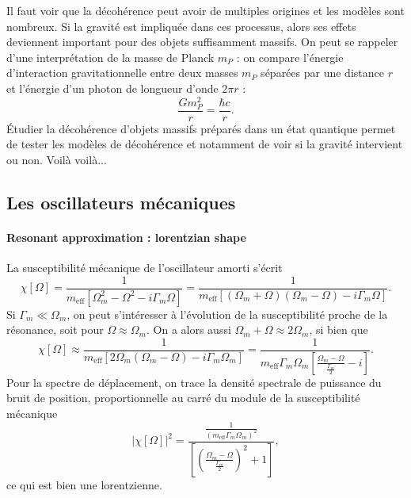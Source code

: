 \documentclass[12pt,a4paper]{article}
\begin{document}
Il faut voir que la décohérence peut avoir de multiples origines et les modèles sont nombreux.
Si la gravité est impliquée dans ces processus, alors ses effets deviennent important pour des objets suffisamment massifs.
On peut se rappeler d'une interprétation de la masse de Planck $m_P$ : on compare l'énergie d'interaction gravitationnelle entre deux masses $m_P$ séparées par une distance $r$ et l'énergie d'un photon de longueur d'onde $2\pi r$ : 
\begin{equation}
\frac{Gm_P^2}{r} = \frac{\hbar c}{r}.
\end{equation}
Étudier la décohérence d'objets massifs préparés dans un état quantique permet de tester les modèles de décohérence et notamment de voir si la gravité intervient ou non.
Voilà voilà...

\subsection{Les oscillateurs mécaniques}
\label{sec:mechanical_oscillators}

\paragraph{Resonant approximation : lorentzian shape\\}
La susceptibilité mécanique de l'oscillateur amorti s'écrit
\begin{equation}
\chi[\Omega] = \frac{1}{m_\mathrm{eff}\left[\Omega_m^2-\Omega^2 - i\Gamma_m\Omega\right]} = \frac{1}{m_\mathrm{eff}\left[(\Omega_m+\Omega)(\Omega_m-\Omega) - i\Gamma_m\Omega\right]}.
\end{equation}
Si $\Gamma_m \ll \Omega_m$, on peut s'intéresser à l'évolution de la susceptibilité proche de la résonance, soit pour $\Omega \approx \Omega_m$.
On a alors aussi $\Omega_m+\Omega \approx 2\Omega_m$, si bien que
\begin{equation}
\chi[\Omega] \approx \frac{1}{m_\mathrm{eff}\left[2\Omega_m(\Omega_m-\Omega) - i\Gamma_m\Omega_m\right]} = \frac{1}{m_\mathrm{eff}\Gamma_m\Omega_m\left[\frac{\Omega_m-\Omega}{\frac{\Gamma_m}{2}} - i\right]}.
\end{equation}
Pour la spectre de déplacement, on trace la densité spectrale de puissance du bruit de position, proportionnelle au carré du module de la susceptibilité mécanique
\begin{equation}
\left|\chi[\Omega]\right|^2 = \frac{\frac{1}{(m_\mathrm{eff}\Gamma_m\Omega_m)^2}}{\left[\left(\frac{\Omega_m-\Omega}{\frac{\Gamma_m}{2}}\right)^2 + 1\right]},
\end{equation}
ce qui est bien une lorentzienne.
\end{document}
